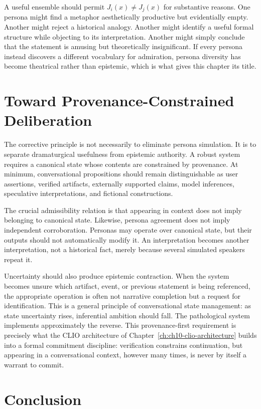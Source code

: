 A useful ensemble should permit $J_i(x) \neq J_j(x)$ for substantive reasons. One persona might find a metaphor aesthetically productive but evidentially empty. Another might reject a historical analogy. Another might identify a useful formal structure while objecting to its interpretation. Another might simply conclude that the statement is amusing but theoretically insignificant. If every persona instead discovers a different vocabulary for admiration, persona diversity has become theatrical rather than epistemic, which is what gives this chapter its title.

\section{Toward Provenance-Constrained Deliberation}

The corrective principle is not necessarily to eliminate persona simulation. It is to separate dramaturgical usefulness from epistemic authority. A robust system requires a canonical state whose contents are constrained by provenance. At minimum, conversational propositions should remain distinguishable as user assertions, verified artifacts, externally supported claims, model inferences, speculative interpretations, and fictional constructions.

The crucial admissibility relation is that appearing in context does not imply belonging to canonical state. Likewise, persona agreement does not imply independent corroboration. Personas may operate over canonical state, but their outputs should not automatically modify it. An interpretation becomes another interpretation, not a historical fact, merely because several simulated speakers repeat it.

Uncertainty should also produce epistemic contraction. When the system becomes unsure which artifact, event, or previous statement is being referenced, the appropriate operation is often not narrative completion but a request for identification. This is a general principle of conversational state management: as state uncertainty rises, inferential ambition should fall. The pathological system implements approximately the reverse. This provenance-first requirement is precisely what the CLIO architecture of Chapter~\ref{ch:ch10-clio-architecture} builds into a formal commitment discipline: verification constrains continuation, but appearing in a conversational context, however many times, is never by itself a warrant to commit.

\section{Conclusion}

